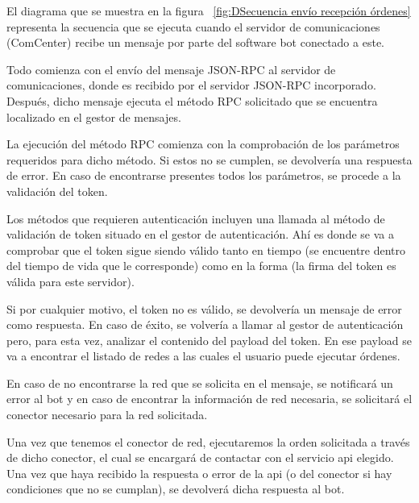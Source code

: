 \documentclass[spanish,12pt, a4paper, twoside]{paper}
\begin{document}
El diagrama que se muestra en la figura ~\ref{fig:DSecuencia envío recepción órdenes} representa la secuencia que se ejecuta cuando el servidor de comunicaciones (ComCenter) recibe un mensaje por parte del software bot conectado a este.
\newline

Todo comienza con el envío del mensaje JSON-RPC al servidor de comunicaciones, donde es recibido por el servidor JSON-RPC incorporado. Después, dicho mensaje ejecuta el método RPC solicitado que se encuentra localizado en el gestor de mensajes.
\newline

La ejecución del método RPC comienza con la comprobación de los parámetros requeridos para dicho método. Si estos no se cumplen, se devolvería una respuesta de error. En caso de encontrarse presentes todos los parámetros, se procede a la validación del token.
\newline

Los métodos que requieren autenticación incluyen una llamada al método de validación de token situado en el gestor de autenticación. Ahí es donde se va a comprobar que el token sigue siendo válido tanto en tiempo (se encuentre dentro del tiempo de vida que le corresponde) como en la forma (la firma del token es válida para este servidor).
\newline

Si por cualquier motivo, el token no es válido, se devolvería un mensaje de error como respuesta. En caso de éxito, se volvería a llamar al gestor de autenticación pero, para esta vez, analizar el contenido del payload del token. En ese payload se va a encontrar el listado de redes a las cuales el usuario puede ejecutar órdenes.

En caso de no encontrarse la red que se solicita en el mensaje, se notificará un error al bot y en caso de encontrar la información de red necesaria, se solicitará el conector necesario para la red solicitada.
\newline

Una vez que tenemos el conector de red, ejecutaremos la orden solicitada a través de dicho conector, el cual se encargará de contactar con el servicio api elegido. Una vez que haya recibido la respuesta o error de la api (o del conector si hay condiciones que no se cumplan), se devolverá dicha respuesta al bot.
\end{document}
